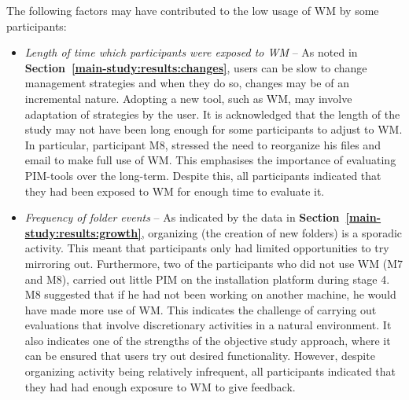 The following factors may have contributed to the low usage of WM by some participants:
\begin{itemize}

\item \textit{Length of time which participants were exposed to WM} -- As noted in \textbf{Section~\ref{main-study:results:changes}}, users can be slow to change management strategies and when they do so, changes may be of an incremental nature.  Adopting a new tool, such as WM, may involve adaptation of strategies by the user.  It is acknowledged that the length of the study may not have been long enough for some participants to adjust to WM.  In particular, participant M8, stressed the need to reorganize his files and email to make full use of WM.  This emphasises the importance of evaluating PIM-tools over the long-term.  Despite this, all participants indicated that they had been exposed to WM for enough time to evaluate it.



\item \textit{Frequency of folder events} -- As indicated by the data in \textbf{Section~\ref{main-study:results:growth}}, organizing (the creation of new folders) is a sporadic activity. This meant that participants only had limited opportunities to try mirroring out.  Furthermore, two of the participants who did not use WM (M7 and M8), carried out little PIM on the installation platform during stage 4.  M8 suggested that if he had not been working on another machine, he would have made more use of WM.  This indicates the challenge of carrying out evaluations that involve discretionary activities in a natural environment.  It also indicates one of the strengths of the objective study approach, where it can be ensured that users try out desired functionality.  However, despite organizing activity being relatively infrequent, all participants indicated that they had had enough exposure to WM to give feedback.


\end{itemize}
